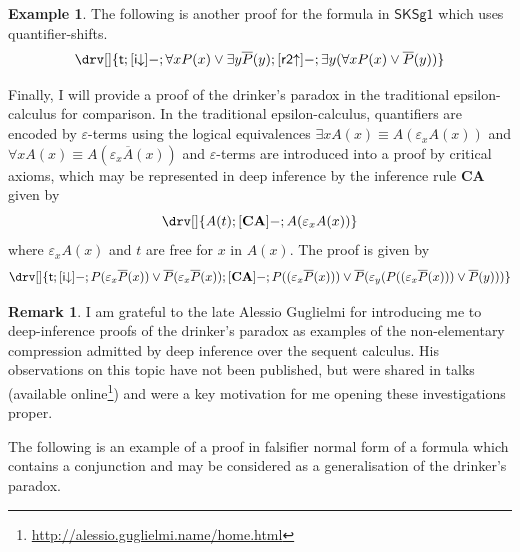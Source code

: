 \documentclass[10pt]{article}
\theoremstyle{definition}\newtheorem{remark}[theorem]{Remark}
\theoremstyle{definition}\newtheorem{example}[theorem]{Example}
\theoremstyle{definition}\newtheorem{definition}[theorem]{Definition}
\newcommand{\SKSq}{{\mathsf{SKSg1}}}
\newcommand{\iDown}{{\mathsf{i\mathord\downarrow}}}
\newcommand{\rTwoUp}{{\mathsf{r2\mathord\uparrow}}}
\newcommand{\trueUnit}{\mathsf{t}}
\begin{document}
\begin{example}
		The following is another proof for the formula in $\SKSq$ which uses quantifier-shifts.
		\[
			\drv[] {
				\trueUnit ; [\iDown]- ; \forall x P(x) \lor \exists y \overline{P}(y) ; [\rTwoUp]- ; \exists y (\forall x P(x) \lor \overline{P}(y))
			}
		\]
		
		Finally, I will provide a proof of the drinker's paradox in the traditional epsilon-calculus for comparison. In the traditional epsilon-calculus, quantifiers are encoded by $\varepsilon$-terms using the logical equivalences $\exists x A(x) \equiv A(\varepsilon_x A(x))$ and $\forall x A(x) \equiv A(\varepsilon_x \overline{A}(x))$ and $\varepsilon$-terms are introduced into a proof by critical axioms, which may be represented in deep inference by the inference rule $\textbf{CA}$ given by
		\[
			\drv[] {
				A(t) ; [\textbf{CA}]- ; A(\varepsilon_x A(x))
			}
		\]
		where $\varepsilon_x A(x)$ and $t$ are free for $x$ in $A(x)$. The proof is given by
		\[
			\drv[] {
				\trueUnit ; [\iDown]- ; P(\varepsilon_x \overline{P}(x)) \lor \overline{P}(\varepsilon_x \overline{P}(x)) ; [\textbf{CA}]- ; P((\varepsilon_x \overline{P}(x))) \lor \overline{P}(\varepsilon_y (P((\varepsilon_x \overline{P}(x))) \lor \overline{P}(y)))
			}
		\]
	\end{example}

	\begin{remark}
		I am grateful to the late Alessio Guglielmi for introducing me to deep-inference proofs of the drinker's paradox as examples of the non-elementary compression admitted by deep inference over the sequent calculus. His observations on this topic have not been published, but were shared in talks (available online\footnote{\href{http://alessio.guglielmi.name/home.html}{http://alessio.guglielmi.name/home.html}}) and were a key motivation for me opening these investigations proper.
	\end{remark}
	
	The following is an example of a proof in falsifier normal form of a formula which contains a conjunction and may be considered as a generalisation of the drinker's paradox.
	
\end{document}
